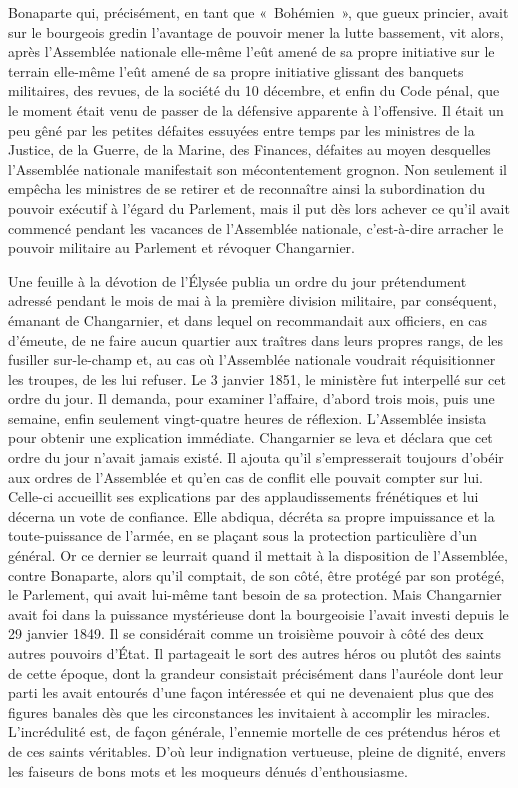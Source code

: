 \documentclass[french,twoside]{book} %
\begin{document}
Bonaparte qui, précisément, en tant que « Bohémien », que gueux princier, avait sur le bourgeois gredin l’avantage de pouvoir mener la lutte bassement, vit alors, après l’Assemblée nationale elle-même l’eût amené de sa propre initiative sur le terrain elle-même l’eût amené de sa propre initiative glissant des banquets militaires, des revues, de la société du 10 décembre, et enfin du Code pénal, que le moment était venu de passer de la défensive apparente à l’offensive. Il était un peu gêné par les petites défaites essuyées entre temps par les ministres de la Justice, de la Guerre, de la Marine, des Finances, défaites au moyen desquelles l’Assemblée nationale manifestait son mécontentement grognon. Non seulement il empêcha les ministres de se retirer et de reconnaître ainsi la subordination du pouvoir exécutif à l’égard du Parlement, mais il put dès lors achever ce qu’il avait commencé pendant les vacances de l’Assemblée nationale, c’est-à-dire arracher le pouvoir militaire au Parlement et révoquer Changarnier.\par
Une feuille à la dévotion de l’Élysée publia un ordre du jour prétendument adressé pendant le mois de mai à la première division militaire, par conséquent, émanant de Changarnier, et dans lequel on recommandait aux officiers, en cas d’émeute, de ne faire aucun quartier aux traîtres dans leurs propres rangs, de les fusiller sur-le-champ et, au cas où l’Assemblée nationale voudrait réquisitionner les troupes, de les lui refuser. Le 3 janvier 1851, le ministère fut interpellé sur cet ordre du jour. Il demanda, pour examiner l’affaire, d’abord trois mois, puis une semaine, enfin seulement vingt-quatre heures de réflexion. L’Assemblée insista pour obtenir une explication immédiate. Changarnier se leva et déclara que cet ordre du jour n’avait jamais existé. Il ajouta qu’il s’empresserait toujours d’obéir aux ordres de l’Assemblée et qu’en cas de conflit elle pouvait compter sur lui. Celle-ci accueillit ses explications par des applaudissements frénétiques et lui décerna un vote de confiance. Elle abdiqua, décréta sa propre impuissance et la toute-puissance de l’armée, en se plaçant sous la protection particulière d’un général. Or ce dernier se leurrait quand il mettait à la disposition de l’Assemblée, contre Bonaparte, alors qu’il comptait, de son côté, être protégé par son protégé, le Parlement, qui avait lui-même tant besoin de sa protection. Mais Changarnier avait foi dans la puissance mystérieuse dont la bourgeoisie l’avait investi depuis le 29 janvier 1849. Il se considérait comme un troisième pouvoir à côté des deux autres pouvoirs d’État. Il partageait le sort des autres héros ou plutôt des saints de cette époque, dont la grandeur consistait précisément dans l’auréole dont leur parti les avait entourés d’une façon intéressée et qui ne devenaient plus que des figures banales dès que les circonstances les invitaient à accomplir les miracles. L’incrédulité est, de façon générale, l’ennemie mortelle de ces prétendus héros et de ces saints véritables. D’où leur indignation vertueuse, pleine de dignité, envers les faiseurs de bons mots et les moqueurs dénués d’enthousiasme.\par
\end{document}
